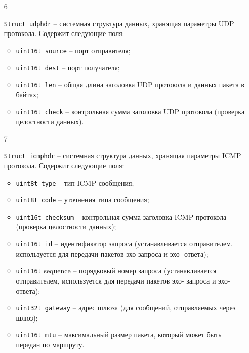 \begin{enumerate}
    \item[6] {{\texttt{Struct udphdr}} -- системная структура данных, хранящая параметры UDP
    протокола. Содержит следующие поля:
        \begin{itemize}
            \item \texttt{u{\textunderscore}int16{\textunderscore}t source} -- порт отправителя;
            \item \texttt{u{\textunderscore}int16{\textunderscore}t dest} -- порт получателя;
            \item \texttt{u{\textunderscore}int16{\textunderscore}t len} -- общая длина заголовка UDP протокола и данных
            пакета в байтах;
            \item \texttt{u{\textunderscore}int16{\textunderscore}t check} -- контрольная сумма заголовка UDP протокола
            (проверка целостности данных).
        \end{itemize}}

    \item[7] {{\texttt{Struct icmphdr}} -- системная структура данных, хранящая параметры
    ICMP протокола. Содержит следующие поля:
    \begin{itemize}
        \item \texttt{u{\textunderscore}int8{\textunderscore}t type} -- тип ICMP-сообщения;
        \item \texttt{u{\textunderscore}int8{\textunderscore}t code} -- уточнения типа сообщения;
        \item \texttt{u{\textunderscore}int16{\textunderscore}t checksum} -- контрольная сумма заголовка ICMP
        протокола (проверка целостности данных);
        \item \texttt{u{\textunderscore}int16{\textunderscore}t id} -- идентификатор запроса (устанавливается
        отправителем, используется для передачи пакетов эхо-запроса и эхо-
        ответа);
        \item \texttt{u{\textunderscore}int16{\textunderscore}t} sequence -- порядковый номер запроса
        (устанавливается отправителем, используется для передачи пакетов эхо-
        запроса и эхо-ответа);
        \item \texttt{u{\textunderscore}int32{\textunderscore}t gateway} -- адрес шлюза (для сообщений, отправляемых
        через шлюз);
        \item \texttt{u{\textunderscore}int16{\textunderscore}t mtu} -- максимальный размер пакета, который может
        быть передан по маршруту.
    \end{itemize}}
\end{enumerate}
